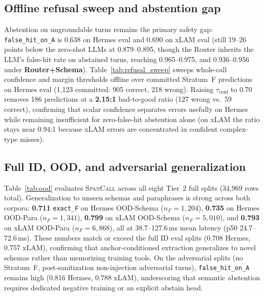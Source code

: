 \subsection{Offline refusal sweep and abstention gap}
\label{sec:results:refusal}
Abstention on ungroundable turns remains the primary safety gap: \texttt{false\_hit\_on\_A} is 0.638 on Hermes eval and 0.690 on xLAM eval (still 19--26 points below the zero-shot LLMs at 0.879--0.895, though the Router inherits the LLM's false-hit rate on abstained turns, reaching 0.965--0.975, and 0.936--0.956 under \textbf{Router+Schema}). Table~\ref{tab:refusal_sweep} sweeps whole-call confidence and margin thresholds offline over committed Stratum~F predictions on Hermes eval (1,123 committed: 905 correct, 218 wrong). Raising $\tau_{\text{conf}}$ to 0.70 removes 186 predictions at a \textbf{2.15:1} bad-to-good ratio (127 wrong vs.\ 59 correct), confirming that scalar confidence separates errors usefully on Hermes while remaining insufficient for zero-false-hit abstention alone (on xLAM the ratio stays near 0.94:1 because xLAM errors are concentrated in confident complex-type misses).

\subsection{Full ID, OOD, and adversarial generalization}
Table~\ref{tab:ood} evaluates \textsc{SpanCall} across all eight Tier~2 full splits (34,969 rows total). Generalization to unseen schemas and paraphrases is strong across both corpora: \textbf{0.711} \texttt{exact\_F} on Hermes OOD-Schema ($n_F{=}1{,}204$), \textbf{0.735} on Hermes OOD-Para ($n_F{=}1{,}341$), \textbf{0.799} on xLAM OOD-Schema ($n_F{=}5{,}010$), and \textbf{0.793} on xLAM OOD-Para ($n_F{=}6{,}868$), all at 38.7--127.6\,ms mean latency (p50 24.7--72.6\,ms). These numbers match or exceed the full ID eval splits (0.708 Hermes, 0.757 xLAM), confirming that anchor-conditioned extraction generalizes to novel schemas rather than memorizing training tools. On the adversarial splits (no Stratum~F, post-sanitization non-injection adversarial turns), \texttt{false\_hit\_on\_A} remains high (0.816 Hermes, 0.788 xLAM), underscoring that semantic abstention requires dedicated negative training or an explicit abstain head.

